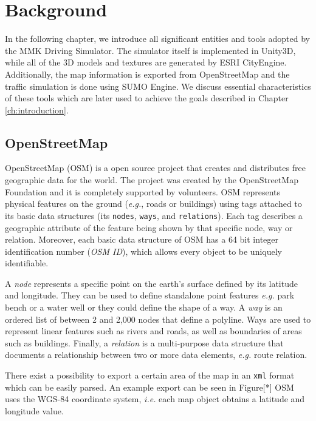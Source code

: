 \chapter{Background}
\label{ch:background}
In the following chapter, we introduce all significant entities and tools adopted by the MMK Driving Simulator. The simulator itself is implemented in Unity3D, while all of the 3D models and textures are generated by ESRI CityEngine. Additionally, the map information is exported from OpenStreetMap and the traffic simulation is done using SUMO Engine. We discuss essential characteristics of these tools which are later used to achieve the goals described in Chapter \ref{ch:introduction}.

\section{OpenStreetMap}
\label{ch:osm}
OpenStreetMap (OSM) is a open source project that creates and distributes free geographic data for the world. The project was created by the OpenStreetMap Foundation and it is completely supported by volunteers. OSM represents physical features on the ground (\emph{e.g.}, roads or buildings) using tags attached to its basic data structures (its \texttt{nodes}, \texttt{ways}, and \texttt{relations}). Each tag describes a geographic attribute of the feature being shown by that specific node, way or relation. Moreover, each basic data structure of OSM has a 64 bit integer identification number (\emph{OSM ID}), which allows every object to be uniquely identifiable.

A \emph{node} represents a specific point on the earth's surface defined by its latitude and longitude. They can be used to define standalone point features \emph{e.g.} park bench or a water well or they could define the shape of a way. A \emph{way} is an ordered list of between 2 and 2,000 nodes that define a polyline. Ways are used to represent linear features such as rivers and roads, as well as boundaries of areas such as buildings. Finally, a \emph{relation} is a multi-purpose data structure that documents a relationship between two or more data elements, \emph{e.g.}  route relation.

There exist a possibility to export a certain area of the map in an \texttt{xml} format which can be easily parsed. An example export can be seen in Figure[*] OSM uses the WGS-84 coordinate system, \emph{i.e.} each map object obtains a latitude and longitude value. 


